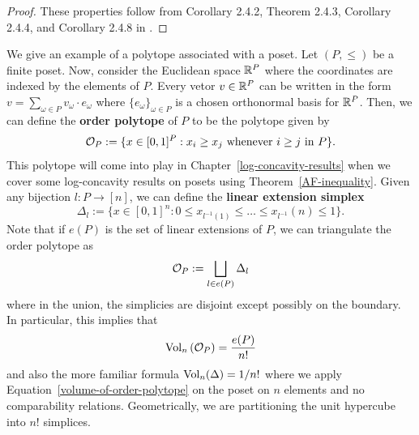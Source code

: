 \documentclass{puthesis-UG}
\begin{document}
\begin{proof}
	These properties follow from Corollary 2.4.2, Theorem 2.4.3, Corollary 2.4.4, and Corollary 2.4.8 in \cite{schneider_2013}. 
\end{proof}
\begin{example}
	We give an example of a polytope associated with a poset. Let $(P, \leq)$ be a finite poset. Now, consider the Euclidean space $\mathbb{R}^P$ where the coordinates are indexed by the elements of $P$. Every vetor $v \in \mathbb{R}^P$ can be written in the form $v = \sum_{\omega \in P} v_\omega \cdot e_\omega$ where $\{e_\omega\}_{\omega \in P}$ is a chosen orthonormal basis for $\mathbb{R}^P$. Then, we can define the \textbf{order polytope} of $P$ to be the polytope given by
	\[
		\mathcal{O}_P := \{x \in [0, 1]^P : x_{i} \geq x_{j} \text{ whenever } i \geq j \text{ in } P\}.
	\]
	This polytope will come into play in Chapter~\ref{log-concavity-results} when we cover some log-concavity results on posets using Theorem~\ref{AF-inequality}. Given any bijection $l : P \to [n]$, we can define the \textbf{linear extension simplex}
	\[
		\Delta_l := \{x \in [0, 1]^n : 0 \leq x_{l^{-1}(1)} \leq \ldots \leq x_{l^{-1}}(n) \leq 1\}.
	\]
	Note that if $e(P)$ is the set of linear extensions of $P$, we can triangulate the order polytope as 
	\[
		\mathcal{O}_P := \bigsqcup_{l \in e(P)} \Delta_l
	\]
	where in the union, the simplicies are disjoint except possibly on the boundary. In particular, this implies that 
	\begin{equation} \label{volume-of-order-polytope}
		\operatorname{Vol}_n \left (\mathcal{O}_P \right ) = \frac{e(P)}{n!}
	\end{equation}
	and also the more familiar formula $\operatorname{Vol}_n (\Delta) = 1/n!$ where we apply Equation~\ref{volume-of-order-polytope} on the poset on $n$ elements and no comparability relations. Geometrically, we are partitioning the unit hypercube into $n!$ simplices. 
\end{example}

\begin{example}

\end{example}
\end{document}
